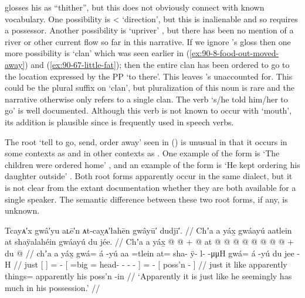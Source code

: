 \citeauthor{swanton:1909} glosses his  as “thither”, but this does not obviously connect with known vocabulary.
One possibility is  <  ‘direction’, but this is inalienable and so requires a possessor.
Another possibility is  ‘upriver’ \parencite[04/31]{leer:1973}, but there has been no mention of a river or other current flow so far in this narrative.
If we ignore \citeauthor{swanton:1909}’s gloss then one more possibility is  ‘clan’ which was seen earlier in (\ref{ex:90-8-food-out-moved-away}) and (\ref{ex:90-67-little-fat}); then the entire clan has been ordered to go to the location expressed by the PP  ‘to there’.
This leaves \citeauthor{swanton:1909}’s  unaccounted for.
This could be the plural suffix  on  ‘clan’, but pluralization of this noun is rare and the narrative otherwise only refers to a single clan.
The verb  ‘s/he told him/her to go’ is well documented.
Although this verb is not known to occur with  ‘mouth’, its addition is plausible since  is frequently used in speech verbs.

The root  ‘tell to go, send, order away’ seen in (\lastx) is unusual in that it occurs in some contexts as  and in other contexts as .
One example of the  form is  ‘The children were ordered home’ \parencite[143.1934]{story-naish:1973}, and an example of the  form is  ‘He kept ordering his daughter outside’ \parencite[143.1938]{story-naish:1973}.
Both root forms apparently occur in the same dialect, but it is not clear from the extant documentation whether they are both available for a single speaker.
The semantic difference between these two root forms, if any, is unknown.

\ex\label{ex:90-83-apparently-he-has-lots}%
%
\begingl
	\glpreamble	Tcayᴀ′x gwâ′yu aʟē′n ᴀt-caỵᴀ′łahēn gwâyū′ dudjī′. //
	\glpreamble	Chʼa a yáx̱ gwáayú aatlein at shaÿalahéin gwáayú du jée. //
	\gla	Chʼa {} a yáx̱ {}
		 @ {} @ {} +
		{}  @ {} at @  @ {} @ {} @ {} @ {} @ {} {}
		 @ {} @ {} +
		{} du  @ {} {} //
	\glb	chʼa {} a yáx̱ {}
		gwá= á -yú
		{} aa =tlein at= sha- ÿ- l-  -μμH {} {}
		gwá= á -yú
		{} du jee -H {} //
	\glc	just {}[   {}]
		=  -
		{}[  =big = head- - -  - \· {}]
		=  -
		{}[  poss’n - {}] //
	\gld	just {} it like {}
		apparently\•  {}
		{}  {} things=  {} {} {} {} {} {}
		apparently\•  {}
		{} his poss’n -in {} //
	\glft	‘Apparently it is just like he seemingly has much in his possession.’
		//
\endgl
\xe

